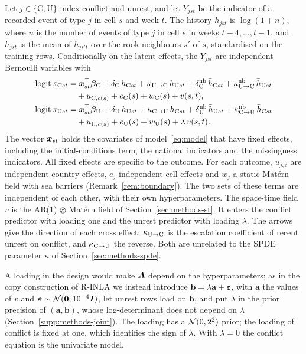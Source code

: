 Let $j \in \{\mathrm{C}, \mathrm{U}\}$ index conflict and unrest, and let $Y_{jst}$ be the
indicator of a recorded event of type $j$ in cell $s$ and week $t$. The history
$h_{jst}$ is $\log(1 + n)$, where $n$ is the number of events of type $j$ in cell $s$ in
weeks $t-4, \dots, t-1$, and $\bar h_{jst}$ is the mean of $h_{js't}$ over the rook neighbours
$s'$ of $s$, standardised on the training rows. Conditionally on the latent effects, the
$Y_{jst}$ are independent Bernoulli variables with
\begin{equation}\label{eq:joint}
\begin{aligned}
\operatorname{logit} \pi_{\mathrm{C}st} &= \bm{x}_{st}^\top \bm{\beta}_{\mathrm{C}}
+ \delta_{\mathrm{C}}\, h_{\mathrm{C}st} + \kappa_{\mathrm{U}\to\mathrm{C}} \, h_{\mathrm{U}st}
+ \delta^{\mathrm{nb}}_{\mathrm{C}}\, \bar h_{\mathrm{C}st} + \kappa^{\mathrm{nb}}_{\mathrm{U}\to\mathrm{C}}\, \bar h_{\mathrm{U}st}\\
&\quad + u_{\mathrm{C},c(s)} + e_{\mathrm{C}}(s) + w_{\mathrm{C}}(s) + v(s,t),\\
\operatorname{logit} \pi_{\mathrm{U}st} &= \bm{x}_{st}^\top \bm{\beta}_{\mathrm{U}}
+ \delta_{\mathrm{U}}\, h_{\mathrm{U}st} + \kappa_{\mathrm{C}\to\mathrm{U}} \, h_{\mathrm{C}st}
+ \delta^{\mathrm{nb}}_{\mathrm{U}}\, \bar h_{\mathrm{U}st} + \kappa^{\mathrm{nb}}_{\mathrm{C}\to\mathrm{U}}\, \bar h_{\mathrm{C}st}\\
&\quad + u_{\mathrm{U},c(s)} + e_{\mathrm{U}}(s) + w_{\mathrm{U}}(s) + \lambda\, v(s,t).
\end{aligned}
\end{equation}
The vector $\bm{x}_{st}$ holds the covariates of model~\eqref{eq:model} that have fixed
effects, including the initial-conditions term, the national indicators and the
missingness indicators. All fixed effects are specific to the outcome. For each outcome, $u_{j,c}$ are independent country
effects, $e_j$ independent cell effects and $w_j$ a static Mat\'ern field with sea
barriers (Remark~\ref{rem:boundary}). The two sets of these terms are independent of
each other, with their own hyperparameters. The space-time field $v$ is the AR(1)
$\otimes$ Mat\'ern field of Section~\ref{sec:methods-st}. It enters the conflict
predictor with loading one and the unrest predictor with loading $\lambda$. The arrows
give the direction of each cross effect: $\kappa_{\mathrm{U}\to\mathrm{C}}$ is the escalation coefficient of recent
unrest on conflict, and $\kappa_{\mathrm{C}\to\mathrm{U}}$ the reverse. Both are unrelated to the SPDE parameter
$\kappa$ of Section~\ref{sec:methods-spde}.

A loading in the design would make $\bm{A}$ depend on the hyperparameters; as in the copy
construction of R-INLA we instead introduce $\bm{b} = \lambda\bm{a} + \bm{\varepsilon}$,
with $\bm{a}$ the values of $v$ and $\bm{\varepsilon} \sim \mathcal{N}(\bm{0}, 10^{-4}\bm{I})$,
let unrest rows load on $\bm{b}$, and put $\lambda$ in the prior precision of
$(\bm{a}, \bm{b})$, whose log-determinant does not depend on $\lambda$
(Section~\ref{supp:methods-joint}). The loading has a $\mathcal{N}(0, 2^2)$ prior; the
loading of conflict is fixed at one, which identifies the sign of $\lambda$. With
$\lambda = 0$ the conflict equation is the univariate model.

